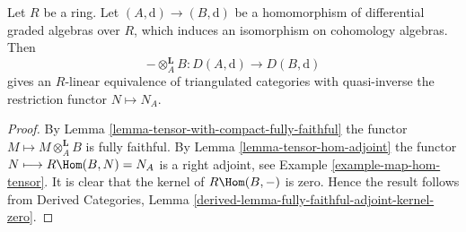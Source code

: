 \begin{lemma}
\label{lemma-qis-equivalence}
Let $R$ be a ring. Let $(A, \text{d}) \to (B, \text{d})$ be a
homomorphism of differential graded algebras over $R$, which induces
an isomorphism on cohomology algebras. Then
$$
- \otimes_A^\mathbf{L} B : D(A, \text{d}) \to D(B, \text{d})
$$
gives an $R$-linear equivalence of triangulated categories with
quasi-inverse the restriction functor $N \mapsto N_A$.
\end{lemma}

\begin{proof}
By Lemma \ref{lemma-tensor-with-compact-fully-faithful}
the functor $M \longmapsto M \otimes_A^\mathbf{L} B$ is
fully faithful. By Lemma \ref{lemma-tensor-hom-adjoint}
the functor $N \longmapsto R\Hom(B, N) = N_A$ is a right adjoint, see
Example \ref{example-map-hom-tensor}.
It is clear that the kernel of $R\Hom(B, -)$ is zero.
Hence the result follows from
Derived Categories, Lemma
\ref{derived-lemma-fully-faithful-adjoint-kernel-zero}.
\end{proof}
